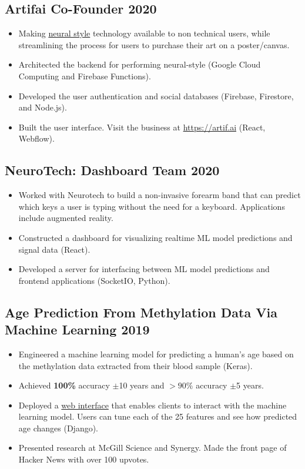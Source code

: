 \documentclass{article}
\begin{document}
\subsection{Artifai Co-Founder \hfill 2020}
\begin{itemize}[leftmargin=0.5in]
  \setlength\itemsep{0.00em}
\item Making \href{https://arxiv.org/abs/1508.06576}{neural style} technology available to non technical users, while streamlining the process for users to purchase their art on a poster/canvas.
\item Architected the backend for performing neural-style (Google Cloud Computing and Firebase Functions).
\item Developed the user authentication and social databases (Firebase, Firestore, and Node.js).
\item Built the user interface. Visit the business at \href{https://artif.ai}{https://artif.ai} (React, Webflow).
\end{itemize}

\subsection{NeuroTech: Dashboard Team \hfill 2020}
\begin{itemize}[leftmargin=0.5in]
  \setlength\itemsep{0.00em}
\item Worked with Neurotech to build a non-invasive forearm band that can predict which keys a user is typing without the need for a keyboard. Applications include augmented reality.
\item Constructed a dashboard for visualizing realtime ML model predictions and signal data (React).
\item Developed a server for interfacing between ML model predictions and frontend applications (SocketIO, Python).
\end{itemize}


\subsection{Age Prediction From Methylation Data Via Machine Learning \hfill 2019}
\begin{itemize}[leftmargin=0.5in]
  \setlength\itemsep{0.00em}
\item Engineered a machine learning model for predicting a human's age based on the methylation data extracted from their blood sample (Keras).
\item Achieved \textbf{100\%} accuracy $\pm$10 years and $>90\%$ accuracy $\pm$5 years.
\item Deployed a \href{https://epigenosys.com}{web interface} that enables clients to interact with the machine learning model. Users can tune each of the 25 features and see how predicted age changes (Django).
\item Presented research at McGill Science and Synergy. Made the front page of Hacker News with over 100 upvotes.
\end{itemize}
\end{document}
